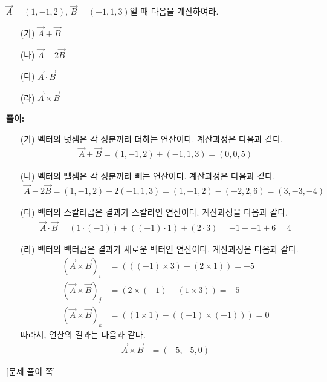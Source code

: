 \documentclass[floatfix,nofootinbib,superscriptaddress,fleqn,preprint]{revtex4-2}
\begin{document}
 $\vec{A}=(1,-1,2)$, $\vec{B}=(-1,1,3)$일 때
다음을 계산하여라.
\begin{itemize}
\item[(가)] $\vec{A}+\vec{B}$
\item[(나)] $\vec{A}-2\vec{B}$
\item[(다)] $\vec{A}\cdot\vec{B}$
\item[(라)] $\vec{A}\times\vec{B}$
\end{itemize}
\noindent \textbf{풀이:}
\begin{itemize}
  \item[(가)]  벡터의 덧셈은 각 성분끼리 더하는 연산이다. 계산과정은 다음과 같다.
  \begin{align*}
    \vec{A}+\vec{B} = (1,-1,2)+(-1,1,3)=(0,0,5)  
  \end{align*}
  
  \item[(나)] 벡터의 뺄셈은 각 성분끼리 빼는 연산이다. 계산과정은 다음과 같다.
  \begin{align*}
    \vec{A}-2\vec{B} = (1,-1,2)-2(-1,1,3)=(1,-1,2)-(-2,2,6)=(3,-3,-4)  
  \end{align*}
  \item[(다)] 벡터의 스칼라곱은 결과가 스칼라인 연산이다. 계산과정을 다음과 같다.
  \begin{align*}
    \vec{A}\cdot\vec{B} = (1\cdot(-1))+((-1)\cdot 1)+(2\cdot 3)=-1+-1+6=4  
  \end{align*}
  \item[(라)] 벡터의 벡터곱은 결과가 새로운 벡터인 연산이다. 계산과정은 다음과 같다.
  \begin{align*}
    {(\vec{A}\times\vec{B})}_i &= (((-1)\times 3) - (2 \times 1)) = -5 \\
    {(\vec{A}\times\vec{B})}_j &= (2 \times (-1) -(1 \times 3)) = -5\\
    {(\vec{A}\times\vec{B})}_k &= ((1 \times 1)-((-1)\times (-1))) = 0
  \end{align*}
  따라서, 연산의 결과는 다음과 같다.
  \begin{align*}
    \vec{A}\times\vec{B}  &= (-5,-5,0)
  \end{align*}
  
\end{itemize}
\newpage

{\color{gray} [문제 풀이 쪽]}

\newpage 
\end{document}
